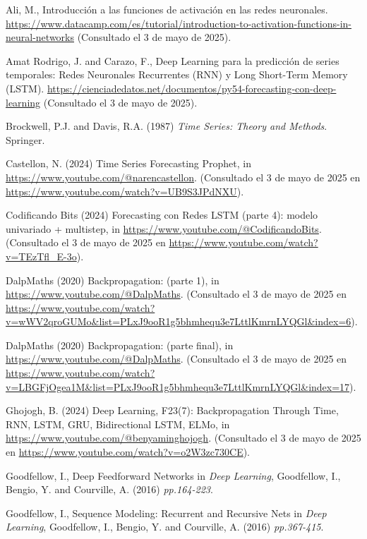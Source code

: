 \documentclass[12pt,twoside]{article}
\begin{document}
\begin{thebibliography}{100}

Ali, M., Introducción a las funciones de activación en las redes neuronales. \url{https://www.datacamp.com/es/tutorial/introduction-to-activation-functions-in-neural-networks} (Consultado el 3 de mayo de 2025).

Amat Rodrigo, J. and Carazo, F., Deep Learning para la predicción de series temporales: Redes Neuronales Recurrentes (RNN) y Long Short-Term Memory (LSTM). \url{https://cienciadedatos.net/documentos/py54-forecasting-con-deep-learning} (Consultado el 3 de mayo de 2025).

Brockwell, P.J. and Davis, R.A. (1987) \textit{Time Series: Theory and Methods}. Springer.

Castellon, N. (2024) Time Series Forecasting Prophet, in \url{https://www.youtube.com/@narencastellon}. (Consultado el 3 de mayo de 2025 en \url{https://www.youtube.com/watch?v=UB9S3JPdNXU}).

Codificando Bits (2024) Forecasting con Redes LSTM (parte 4): modelo univariado + multistep, in \url{https://www.youtube.com/@CodificandoBits}. (Consultado el 3 de mayo de 2025 en \url{https://www.youtube.com/watch?v=TEzTfl_E-3o}).

DalpMaths (2020) Backpropagation: (parte 1), in \url{https://www.youtube.com/@DalpMaths}. (Consultado el 3 de mayo de 2025 en \url{https://www.youtube.com/watch?v=wWV2qroGUMo&list=PLxJ9ooR1g5bhmhequ3e7LttlKmrnLYQGl&index=6}).

DalpMaths (2020) Backpropagation: (parte final), in \url{https://www.youtube.com/@DalpMaths}. (Consultado el 3 de mayo de 2025 en \url{https://www.youtube.com/watch?v=LBGFjOgea1M&list=PLxJ9ooR1g5bhmhequ3e7LttlKmrnLYQGl&index=17}).

Ghojogh, B. (2024) Deep Learning, F23(7): Backpropagation Through Time, RNN, LSTM, GRU, Bidirectional LSTM, ELMo, in \url{https://www.youtube.com/@benyaminghojogh}. (Consultado el 3 de mayo de 2025 en \url{https://www.youtube.com/watch?v=o2W3zc730CE}).

Goodfellow, I., Deep Feedforward Networks in \textit{Deep Learning}, Goodfellow, I., Bengio, Y. and Courville, A. (2016) \textit{pp.164-223}.

Goodfellow, I., Sequence Modeling: Recurrent and Recursive Nets in \textit{Deep Learning}, Goodfellow, I., Bengio, Y. and Courville, A. (2016) \textit{pp.367-415}.


\end{thebibliography}
\end{document}

